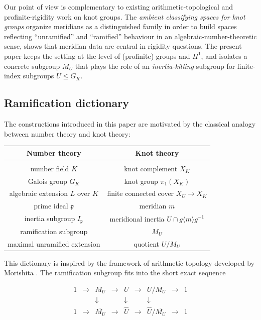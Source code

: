 \documentclass[11pt]{article}
\begin{document}
	Our point of view is complementary to existing arithmetic-topological and profinite-rigidity work on knot groups. The \textit{ambient classifying spaces for knot groups} \cite{PasiniClassifying, PasiniAmbClassSp} organize meridians as a distinguished family in order to build spaces reflecting ``unramified'' and ``ramified'' behaviour in an algebraic-number-theoretic sense, shows that meridian data are central in rigidity questions. The present paper keeps the setting at the level of (profinite) groups and $H^1$, and isolates a concrete subgroup $M_U$ that plays the role of an \textit{inertia-killing} subgroup for finite-index subgroups $U\le G_K$.
	
	\subsection*{Ramification dictionary}
	
	The constructions introduced in this paper are motivated by the classical analogy between number theory and knot theory:
	
	\begin{center}
		\begin{tabular}{c|c}
			Number theory & Knot theory \\[0.2em]
			\hline\\[-0.8em]
			number field $K$ & knot complement $X_K$ \\
			Galois group $G_K$ & knot group $\pi_1(X_K)$ \\
			algebraic extension $L$ over $K$ & finite connected cover $X_U\to X_K$\\
			prime ideal $\mathfrak p$ & meridian $m$ \\
			inertia subgroup $I_{\mathfrak p}$ & meridional inertia $U\cap g\langle m\rangle g^{-1}$ \\
			ramification subgroup & $M_U$ \\
			maximal unramified extension & quotient $U/M_U$
		\end{tabular}
	\end{center}
	
	This dictionary is inspired by the framework of arithmetic topology developed by Morishita \cite{Morishita}. The ramification subgroup fits into the short exact sequence
	
	\[\begin{array}{ccccccccc}
		1 & \to & M_U & \to & U & \to & U/M_U & \to & 1 \\
		& & \downarrow & & \downarrow & & \downarrow & & \\
		1 & \to & \overline{M_U} & \to & \widehat U & \to & \widehat U/\overline{M_U} & \to & 1
	\end{array}\]
	
\end{document}
